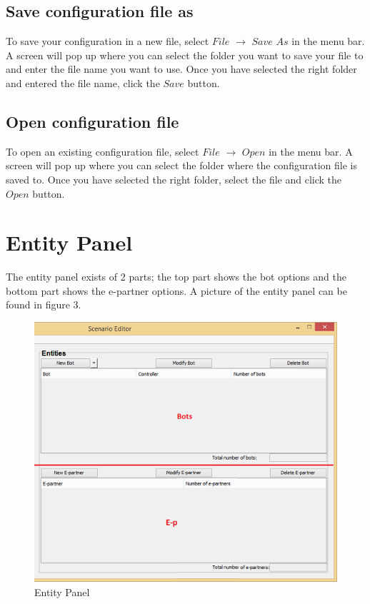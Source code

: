 \documentclass[a4paper]{article}
\begin{document}
\subsection{Save configuration file as}
To save your configuration in a new file, select $File$ $\to$ $Save$ $As$ in the menu bar. A screen will pop up where you can select the folder you want to save your file to and enter the file name you want to use. Once you have selected the right folder and entered the file name, click the $Save$ button.

\subsection{Open configuration file}
To open an existing configuration file, select $File$ $\to$ $Open$ in the menu bar. A screen will pop up where you can select the folder where the configuration file is saved to. Once you have selected the right folder, select the file and click the $Open$ button.

\section{Entity Panel}
The entity panel exists of 2 parts; the top part shows the bot options and the bottom part shows the e-partner options. A picture of the entity panel can be found in figure 3.
\begin{figure}[h]
\begin{center}
\includegraphics{bot.png}
\end{center}
\caption{Entity Panel}
\end{figure}
\end{document}
